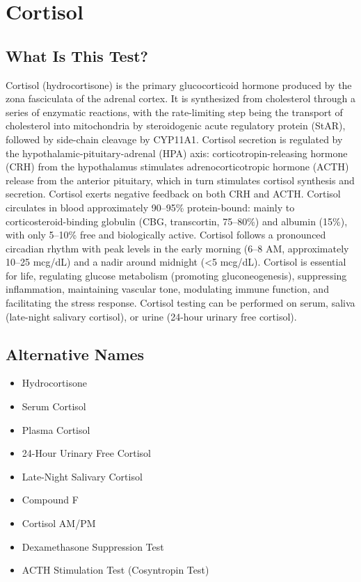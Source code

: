\chapter{Cortisol}

\section*{What Is This Test?}
Cortisol (hydrocortisone) is the primary glucocorticoid hormone produced by the zona fasciculata of the adrenal cortex. It is synthesized from cholesterol through a series of enzymatic reactions, with the rate-limiting step being the transport of cholesterol into mitochondria by steroidogenic acute regulatory protein (StAR), followed by side-chain cleavage by CYP11A1. Cortisol secretion is regulated by the hypothalamic-pituitary-adrenal (HPA) axis: corticotropin-releasing hormone (CRH) from the hypothalamus stimulates adrenocorticotropic hormone (ACTH) release from the anterior pituitary, which in turn stimulates cortisol synthesis and secretion. Cortisol exerts negative feedback on both CRH and ACTH. Cortisol circulates in blood approximately 90--95\% protein-bound: mainly to corticosteroid-binding globulin (CBG, transcortin, 75--80\%) and albumin (15\%), with only 5--10\% free and biologically active. Cortisol follows a pronounced circadian rhythm with peak levels in the early morning (6--8 AM, approximately 10--25 mcg/dL) and a nadir around midnight (<5 mcg/dL). Cortisol is essential for life, regulating glucose metabolism (promoting gluconeogenesis), suppressing inflammation, maintaining vascular tone, modulating immune function, and facilitating the stress response. Cortisol testing can be performed on serum, saliva (late-night salivary cortisol), or urine (24-hour urinary free cortisol).

\section*{Alternative Names}
\begin{itemize}
  \item Hydrocortisone
  \item Serum Cortisol
  \item Plasma Cortisol
  \item 24-Hour Urinary Free Cortisol
  \item Late-Night Salivary Cortisol
  \item Compound F
  \item Cortisol AM/PM
  \item Dexamethasone Suppression Test
  \item ACTH Stimulation Test (Cosyntropin Test)
\end{itemize}

